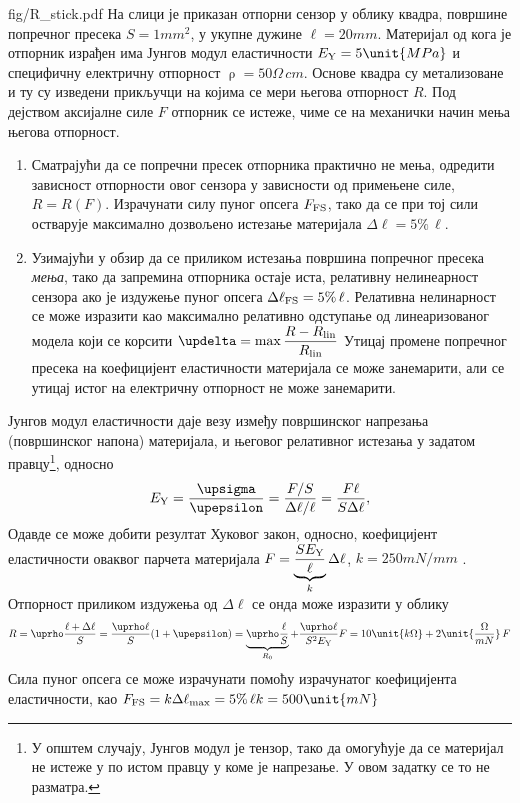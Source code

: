\begin{slikaDesno}{fig/R_stick.pdf}
\PID 
На слици је приказан отпорни сензор у облику квадра, површине попречног пресека $S = 1\unit{mm^2}$, у укупне дужине 
$\ell = 20\unit{mm}$. 
Материјал од кога је отпорник израђен има Јунгов модул еластичности $E_{\rm Y} = 5\unit{MPa}$ и специфичну електричну
отпорност $\uprho = 50\unit{\Omega\,cm}$. Основе квадра су метализоване и ту су изведени прикључци на којима се мери његова отпорност $R$. 
Под дејством аксијалне силе $F$ отпорник се истеже, чиме се на механички начин мења 
његова отпорност. 
\end{slikaDesno}
\begin{enumerate}[label=(\alph*)]
    \item Сматрајући да се попречни пресек отпорника практично не мења, одредити зависност отпорности овог сензора 
    у зависности од примењене силе, $R = R(F)$. Израчунати силу пуног опсега $F_{\rm FS}$, тако да се при тој сили 
    остварује максимално дозвољено истезање материјала $\Delta \ell = 5\% \, \ell$.

    \item Узимајући у обзир да се приликом истезања површина попречног пресека \textit{мења}, тако да запремина 
    отпорника остаје иста, релативну нелинеарност сензора ако је издужење пуног опсега $\Delta \ell_{\rm FS} = 5\%\,\ell$.
    Релативна нелинарност се може изразити као максимално релативно одступање од линеаризованог модела који се корсити 
    $\updelta = \max \dfrac{R - R_{\rm lin}}{R_{\rm lin}}$
    Утицај промене попречног пресека на коефицијент еластичности материјала се може занемарити, али се утицај истог на 
    електричну отпорност не може занемарити.
\end{enumerate} 

\RESENJE

Јунгов модул еластичности даје везу између површинског напрезања (површинског напона) материјала, и његовог релативног истезања 
у задатом правцу\footnote{У општем случају, Јунгов модул је тензор, тако да омогућује да се материјал не истеже у по истом правцу 
у коме је напрезање. У овом задатку се то не разматра.}, односно 
\begin{equation}
    E_{\rm Y} = \dfrac{\upsigma}{\upepsilon} = \dfrac{F/S}{\Delta \ell/\ell} = \dfrac{F \ell}{S \Delta \ell},
    \label{eq:\ID:jung_uvod}
\end{equation}
Одавде се може добити резултат Хуковог закон, односно, коефицијент еластичности оваквог парчета материјала 
$F = \underbrace{\dfrac{S E_{\rm Y}}{\ell}}_k \Delta \ell$,
$k = 250\unit{mN/mm}$ . Отпорност приликом издужења 
од $\Delta \ell$ се онда може изразити у облику 
\begin{equation}
    R = \uprho \dfrac{\ell + \Delta \ell}{S}
      = \dfrac{\uprho \ell}{S} (1 + \upepsilon)
      = \underbrace{\uprho \dfrac{\ell}S}_{R_0} + \frac{\uprho \ell}{S^2 E_{\rm Y}} F 
      = 10\unit{k\Omega} + 2\unit{\dfrac{\Omega}{mN}} \, F
      \label{eq:\ID:R_x}
\end{equation}
Сила пуног опсега се може израчунати помоћу израчунатог коефицијента еластичности, као 
$F_{\rm FS} = k {\Delta \ell_{\rm max}} = {5\%\,\ell}{k} = 500\unit{mN}$

